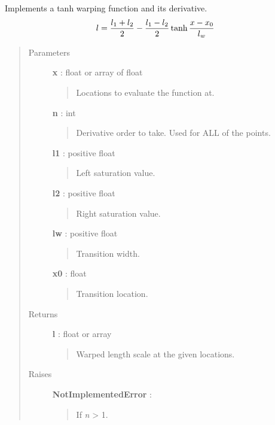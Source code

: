 \documentclass[letterpaper,10pt,english]{sphinxmanual}
\begin{document}
\begin{fulllineitems}
\label{gptools.kernel:gptools.kernel.gibbs.tanh_warp}
Implements a tanh warping function and its derivative.
\begin{gather}
\begin{split}l = \frac{l_1 + l_2}{2} - \frac{l_1 - l_2}{2}\tanh\frac{x-x_0}{l_w}\end{split}\notag
\end{gather}\begin{quote}\begin{description}
\item[{Parameters}] \leavevmode
\textbf{x} : float or array of float
\begin{quote}

Locations to evaluate the function at.
\end{quote}

\textbf{n} : int
\begin{quote}

Derivative order to take. Used for ALL of the points.
\end{quote}

\textbf{l1} : positive float
\begin{quote}

Left saturation value.
\end{quote}

\textbf{l2} : positive float
\begin{quote}

Right saturation value.
\end{quote}

\textbf{lw} : positive float
\begin{quote}

Transition width.
\end{quote}

\textbf{x0} : float
\begin{quote}

Transition location.
\end{quote}

\item[{Returns}] \leavevmode
\textbf{l} : float or array
\begin{quote}

Warped length scale at the given locations.
\end{quote}

\item[{Raises}] \leavevmode
\textbf{NotImplementedError} :
\begin{quote}

If \emph{n} \textgreater{} 1.
\end{quote}

\end{description}\end{quote}

\end{fulllineitems}
\end{document}
